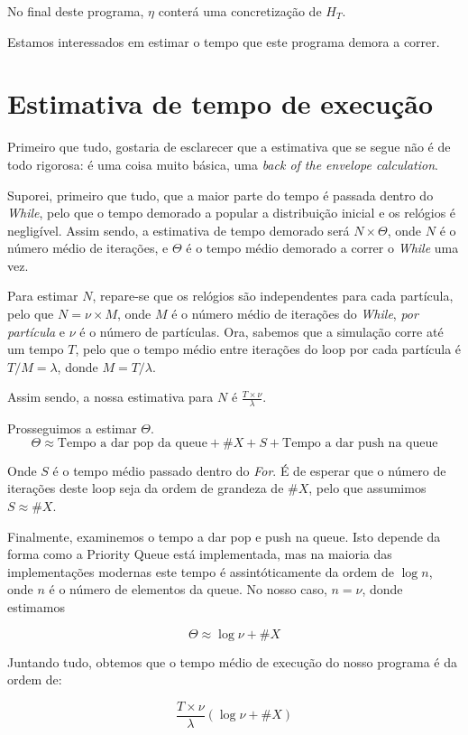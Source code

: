 \documentclass{article}
\begin{document}
	No final deste programa, $\eta$ conterá uma concretização de $H_T$.
	
	Estamos interessados em estimar o tempo que este programa demora a correr.
	
	\section{Estimativa de tempo de execução}
	
	Primeiro que tudo, gostaria de esclarecer que a estimativa que se segue não é de todo rigorosa: é uma coisa muito básica, uma \emph{back of the envelope calculation}.
	
	Suporei, primeiro que tudo, que a maior parte do tempo é passada dentro do \emph{While}, pelo que o tempo demorado a popular a distribuição inicial e os relógios é negligível. Assim sendo, a estimativa de tempo demorado será $N \times \Theta$, onde $N$ é o número médio de iterações, e $\Theta$ é o tempo médio demorado a correr o \emph{While} uma vez.
	
	Para estimar $N$, repare-se que os relógios são independentes para cada partícula, pelo que $N = \nu \times M$, onde $M$ é o número médio de iterações do \emph{While}, \emph{por partícula} e $\nu$ é o número de partículas. Ora, sabemos que a simulação corre até um tempo $T$, pelo que o tempo médio entre iterações do loop por cada partícula é $T/M = \lambda$, donde $M = T/\lambda$.
	
	Assim sendo, a nossa estimativa para $N$ é $\frac{T \times \nu}\lambda$.
	
	Prosseguimos a estimar $\Theta$.
	\[\Theta \approx \text{Tempo a dar pop da queue} + \#X + S + \text{Tempo a dar push na queue}\]
	
	Onde $S$ é o tempo médio passado dentro do \emph{For}. É de esperar que o número de iterações deste loop seja da ordem de grandeza de $\#X$, pelo que assumimos $S \approx \#X$.
	
	Finalmente, examinemos o tempo a dar pop e push na queue. Isto depende da forma como a Priority Queue está implementada, mas na maioria das implementações modernas este tempo é assintóticamente da ordem de $\log n$, onde $n$ é o número de elementos da queue. No nosso caso, $n = \nu$, donde estimamos
	
	\[\Theta \approx \log \nu + \#X\]
	
	Juntando tudo, obtemos que o tempo médio de execução do nosso programa é da ordem de:
	
	\[\frac{T \times \nu}\lambda (\log \nu + \#X)\]
	
\end{document}

